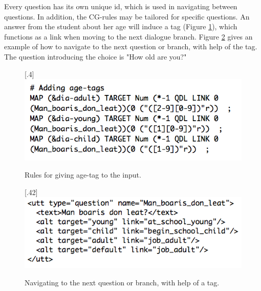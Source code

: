 \documentclass[11pt]{article}
\begin{document}
Every question has its own unique id, which is used in navigating between questions. In addition, the CG-rules may be tailored for specific questions. An answer from the student about her age will induce a tag (Figure \ref{age}), which functions as a link when moving to the next dialogue branch. Figure \ref{branch} gives an example of how to navigate to the next question or branch, with help of the tag. The question introducing the choice is "How old are you?"

\begin{figure}[htbp]
\begin{center}
\scalebox{.4}[.4]{\includegraphics{presentation/img/picking_age2.png}}\\
\caption{Rules for giving age-tag to the input.}
\label{age}
\end{center}
\end{figure}

\begin{figure}[htbp]
\begin{center}
\scalebox{.42}[.42]{\includegraphics{presentation/img/Man_boarisEng.png}}\\
\caption{Navigating to the next question or branch, with help of a tag.}
\label{branch}
\end{center}
\end{figure}
\end{document}
